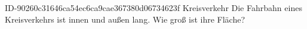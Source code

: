 \begin{exercise}
      {ID-90260c31646ca54ec6ca9cae367380d06734623f}
      {Kreisverkehr}
  \ifproblem\problem
    Die Fahrbahn eines Kreisverkehrs ist innen  und außen
     lang. Wie groß ist ihre Fläche?
  \fi
\end{exercise}
